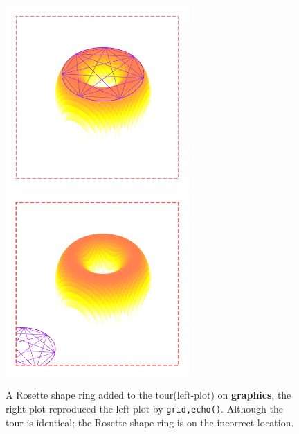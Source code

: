 \documentclass{report}
\begin{document}
\begin{figure}[h]
	\begin{center}
		\includegraphics[height = 7cm, width = 7cm]{figure/gridGraphics_persp_demo_viewport2_1.pdf}
		\includegraphics[height = 7cm, width = 7cm]{figure/gridGraphics_persp_demo_viewport2_2.pdf}
		\caption{A Rosette shape ring added to the tour(left-plot) on \textbf{graphics}, the right-plot reproduced the left-plot by \texttt{grid,echo()}. Although the tour is identical; the Rosette shape ring is on the incorrect location.}
		\label{figure_4.4}
	\end{center}
\end{figure}
\end{document}
